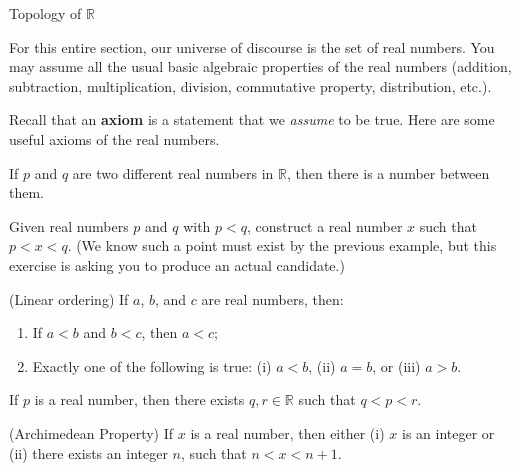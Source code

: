 \begin{section}{Topology of $\mathbb{R}$}


\begin{remark}
For this entire section, our universe of discourse is the set of real numbers.  You may assume all the usual basic algebraic properties of the real numbers (addition, subtraction, multiplication, division, commutative property, distribution, etc.).
\end{remark}

Recall that an \textbf{axiom} is a statement that we \emph{assume} to be true.  Here are some useful axioms of the real numbers.

\begin{axiom} 
If $p$ and $q$ are two different real numbers in $\mathbb{R}$, then there is a number between them.
\end{axiom}

\begin{exercise}
Given real numbers $p$ and $q$ with $p<q$, construct a real number $x$ such that $p<x<q$.  (We know such a point must exist by the previous example, but this exercise is asking you to produce an actual candidate.)
\end{exercise}

\begin{axiom}
(Linear ordering) If $a$, $b$, and $c$ are real numbers, then:
\begin{enumerate}
\item If $a < b$ and $b<c$, then $a<c$;
\item Exactly one of the following is true: (i) $a < b$, (ii) $a=b$, or (iii) $a>b$.
\end{enumerate}
\end{axiom}

\begin{axiom}
If $p$ is a real number, then there exists $q,r\in\mathbb{R}$ such that $q<p<r$.
\end{axiom}

\begin{axiom}
(Archimedean Property) If $x$ is a real number, then either (i) $x$ is an integer or (ii) there exists an integer $n$, such that $n<x<n+1$. 
\end{axiom}


\end{section}
